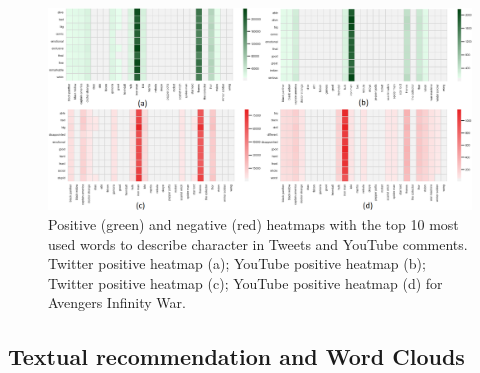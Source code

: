 \begin{figure}[htb]
\begin{center}
    \includegraphics[width=1\linewidth]{img/VingadoresHeatMap.png}
\end{center}
   \caption{Positive (green) and negative (red) heatmaps with the top 10 most used words to describe character in Tweets and YouTube comments. Twitter positive heatmap (a); YouTube positive heatmap (b); Twitter positive heatmap (c); YouTube positive heatmap (d) for Avengers Infinity War.}
\label{fig:VingadoresHeatMap}
\end{figure}

\subsection{Textual recommendation and Word Clouds}




